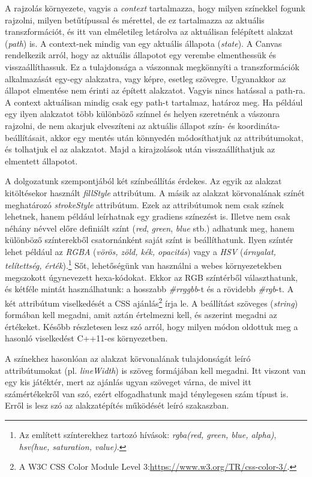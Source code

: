 \documentclass[12pt]{report}
\theoremstyle{definition}
\newcommand{\inenglish}[1]{\textsl{#1}}
\newcommand{\func}[1]{{\textsl{#1}}}
\begin{document}
A rajzolás környezete, vagyis a \emph{context} tartalmazza, hogy milyen
színekkel fogunk rajzolni, milyen betűtípussal és mérettel, de ez tartalmazza
az aktuális transzformációt, és itt van elméletileg letárolva az aktuálisan
felépített alakzat (\inenglish{path}) is. A context-nek mindig van egy aktuális
állapota (\inenglish{state}). A Canvas rendelkezik arról, hogy az aktuális
állapotot egy verembe elmenthessük és visszaállíthassuk. Ez a tulajdonsága a
vászonnak megkönnyíti a transzformációk alkalmazását egy-egy alakzatra, vagy
képre, esetleg szövegre. Ugyanakkor az állapot elmentése nem érinti az épített
alakzatot. Vagyis nincs hatással a path-ra. A context aktuálisan mindig csak
egy path-t tartalmaz, határoz meg. Ha például egy ilyen alakzatot több
különböző színnel és helyen szeretnénk a vászonra rajzolni, de nem akarjuk
elveszíteni az aktuális állapot szín- és koordináta-beállításait, akkor egy
mentés után könnyedén módosíthatjuk az attribútumokat, és tolhatjuk el az
alakzatot. Majd a kirajzolások után visszaállíthatjuk az elmentett állapotot.

A dolgozatunk szempontjából két színbeállítás érdekes. Az egyik az alakzat
kitöltésekor használt \func{fillStyle} attribútum. A másik az alakzat
körvonalának színét meghatározó \func{strokeStyle} attribútum. Ezek az
attribútumok nem csak színek lehetnek, hanem például leírhatnak egy gradiens
színezést is. Illetve nem csak néhány névvel előre definiált színt (\func{red},
\func{green}, \func{blue} stb.) adhatunk meg, hanem különböző színterekből
csatornánként saját színt is beállíthatunk. Ilyen színtér lehet például az
\emph{RGBA} (\emph{vörös, zöld, kék, opacitás}) vagy a \emph{HSV}
(\emph{árnyalat, telítettség, érték}).\footnote{Az említett színterekhez
tartozó hívások: \func{rgba(red, green, blue, alpha)}, \func{hsv(hue,
saturation, value)}.} Sőt, lehetőségünk van használni a webes környezetekben
megszokott úgynevezett hexa-kódokat. Ekkor az RGB színtérből választhatunk, és
kétféle mintát használhatunk: a hosszabb \func{\#rrggbb}-t és a rövidebb
\func{\#rgb}-t. A két attribútum viselkedését a CSS ajánlás\footnote{A W3C CSS
Color Module Level 3:{\footnotesize \url{https://www.w3.org/TR/css-color-3/}}.}
írja le. A beállítást szöveges (\func{string}) formában kell megadni, amit
aztán értelmezni kell, és aszerint megadni az értékeket. Később részletesen
lesz szó arról, hogy milyen módon oldottuk meg a hasonló viselkedést C++11-es
környezetben.

A színekhez hasonlóan az alakzat körvonalának tulajdonságát leíró
attribútumokat (pl. \func{lineWidth}) is szöveg formájában kell megadni. Itt
viszont van egy kis játéktér, mert az ajánlás ugyan szöveget várna, de mivel
itt számértékekről van szó, ezért elfogadhatunk majd ténylegesen szám típust
is. Erről is lesz szó az alakzatépítés működését leíró szakaszban.
\end{document}
